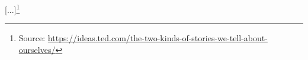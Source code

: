 \documentclass[10pt,a4paper]{article}
\newcommand{\source}[1]{\footnote{Source: \href{#1}{#1}}}
\begin{document}
[...]\source{https://ideas.ted.com/the-two-kinds-of-stories-we-tell-about-ourselves/}

%
%
%
%
%
%
\end{document}
